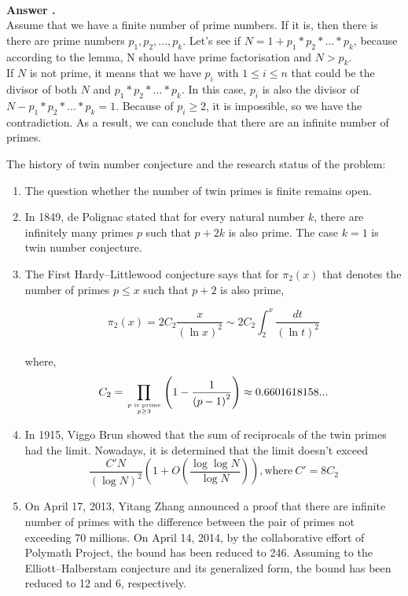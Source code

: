 \documentclass[paper=8.27in:11.69in, DIV=calc]{scrartcl}
\newcounter{numbers}
\newcounter{answers}
\newcommand\printanswers{\refstepcounter{answers}\theanswers}
\begin{document}
\textbf{\\Answer \printanswers . \\}
Assume that we have a finite number of prime numbers. If it is, then there is there are prime numbers \(p_{1}, p_{2}, \ldots, p_{k} \). Let's see if \(N = 1+p_{1}*p_{2}* \ldots*p_{k}\), because according to the lemma, N should have prime factorisation and \(N > p_{k} \).\\

If \(N\) is not prime, it means that we have \(p_{i}\) with \(1 \leq i \leq n \) that could be the divisor of both \(N\) and \(p_{1}*p_{2}* \ldots * p_{k}\). In this case, \(p_{i}\) is also the divisor of \(N - p_{1}*p_{2}* \ldots*p_{k}=1\). Because of \(p_{i} \geq 2 \), it is impossible, so we have the contradiction. As a result, we can conclude that there are an infinite number of primes.

\quad The history of twin number conjecture and the research status of the problem:
\begin{enumerate}
\item The question whether the number of twin primes is finite remains open.
\item In 1849, de Polignac stated that for every natural number \(k\), there are infinitely many primes \(p\) such that \(p + 2k\) is also prime. The case \(k=1\) is twin number conjecture.
\item The First Hardy–Littlewood conjecture says that for \(\pi_{2}(x)\) that denotes the number of primes \(p \leq x\) such that \(p + 2\) is also prime,

\[\pi_{2}(x) = 2C_{2} \frac{x}{{(\ln{x})}^{2}} \sim 2C_{2} \int_{2}^{x} \frac{dt}{{(\ln{t})}^{2}}\]
\\
where, 
\[C_{2} = \prod_{p \text{ is prime} \atop{p \geq 3}} \left (1-\frac{1}{{(p-1)}^{2}}  \right ) \approx 0.6601618158...\]
\item In 1915, Viggo Brun showed that the sum of reciprocals of the twin primes had the limit. Nowadays, it is determined that the limit doesn't exceed \[\frac{C'N}{(\log N)^{2}}\left ( 1+O\left ( \frac{\log \log N}{\log N} \right ) \right ), \text{where} \ C' = 8C_{2}\]

\item On April 17, 2013, Yitang Zhang announced a proof that there are infinite number of primes with the difference between the pair of primes not exceeding 70 millions. On April 14, 2014, by the collaborative effort of Polymath Project, the bound has been reduced to 246. Assuming to the Elliott–Halberstam conjecture and its generalized form, the bound has been reduced to 12 and 6, respectively.

\end{enumerate}
\end{document}
